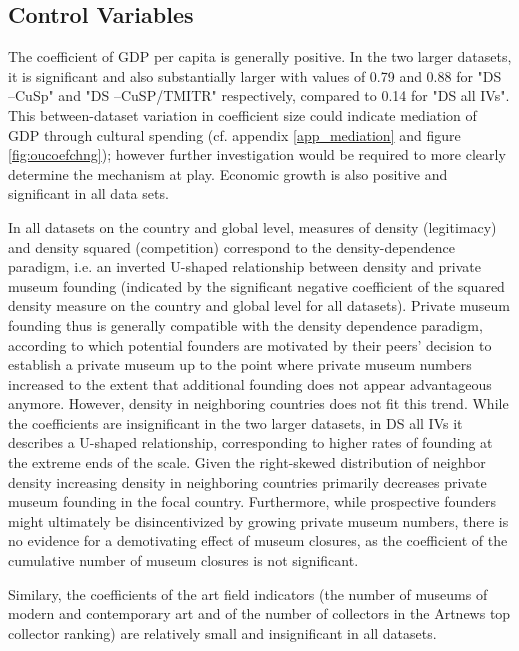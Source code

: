 \documentclass[11pt]{article}
\begin{document}
\subsection{Control Variables}
\label{app_controls}



The coefficient of GDP per capita is generally positive. 
In the two larger datasets, it is significant and also substantially larger with values of 0.79 and 0.88 for "DS --CuSp" and "DS --CuSP/TMITR" respectively, compared to 0.14 for "DS all IVs".
This between-dataset variation in coefficient size could indicate mediation of GDP through cultural spending (cf. appendix \ref{app_mediation} and figure \ref{fig:oucoefchng}); however further investigation would be required to more clearly determine the mechanism at play. 
Economic growth is also positive and significant in all data sets.





In all datasets on the country and global level, measures of density (legitimacy) and density squared (competition) correspond to the density-dependence paradigm, i.e. an inverted U-shaped relationship between density and private museum founding (indicated by the significant negative coefficient of the squared density measure on the country and global level for all datasets). 
Private museum founding thus is generally compatible with the density dependence paradigm, according to which potential founders are motivated by their peers' decision to establish a private museum up to the point where private museum numbers increased to the extent that additional founding does not appear advantageous anymore.
However, density in neighboring countries does not fit this trend.
While the coefficients are insignificant in the two larger datasets, in DS all IVs it describes a U-shaped relationship, corresponding to higher rates of founding at the extreme ends of the scale.
Given the right-skewed distribution of neighbor density increasing density in neighboring countries primarily decreases private museum founding in the focal country.
Furthermore, while prospective founders might ultimately be disincentivized by growing private museum numbers, there is no evidence for a demotivating effect of museum closures, as the coefficient of the cumulative number of museum closures is not significant.






Similary, the coefficients of the art field indicators (the number of museums of modern and contemporary art and of the number of collectors in the Artnews top collector ranking) are relatively small and insignificant in all datasets.
\end{document}
